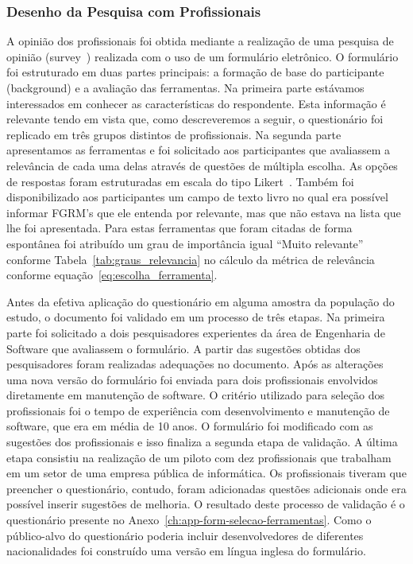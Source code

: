 \subsubsection{Desenho da Pesquisa com Profissionais}
\label{ssub:metodologia_desenho_da_pesquisa_com_profissionais}

A opinião dos profissionais foi obtida mediante a realização de uma pesquisa de
opinião (survey~\cite{wohlin2012experimentation}) realizada com o uso de um
formulário eletrônico. O formulário foi estruturado em duas partes principais: a
formação de base do participante (background) e a avaliação das ferramentas. Na
primeira parte estávamos interessados em conhecer as características do
respondente. Esta informação é relevante tendo em vista que, como descreveremos
a seguir, o questionário foi replicado em três grupos distintos de
profissionais. Na segunda parte apresentamos as ferramentas e foi solicitado aos
participantes que avaliassem a relevância de cada uma delas através de questões
de múltipla escolha. As opções de respostas foram estruturadas em escala do tipo
Likert~\cite{robbins2011plotting}. Também foi disponibilizado aos participantes
um campo de texto livro no qual era possível informar FGRM's que ele entenda por
relevante, mas que não estava na lista que lhe foi apresentada. Para estas
ferramentas que foram citadas de forma espontânea foi atribuído um grau de
importância igual ``Muito relevante'' conforme Tabela~\ref{tab:graus_relevancia}
no cálculo da métrica de relevância conforme
equação~\ref{eq:escolha_ferramenta}.

Antes da efetiva aplicação do questionário em alguma amostra da população do
estudo, o documento foi validado em um processo de três etapas. Na primeira
parte foi solicitado a dois pesquisadores experientes da área de Engenharia de
Software que avaliassem o formulário. A partir das sugestões obtidas dos
pesquisadores foram realizadas adequações no documento. Após as alterações uma
nova versão do formulário foi enviada para dois profissionais envolvidos
diretamente em manutenção de software. O critério utilizado para seleção dos
profissionais foi o tempo de experiência com desenvolvimento e manutenção de
software, que era em média de 10 anos. O formulário foi modificado com as
sugestões dos profissionais e isso finaliza a segunda etapa de validação. A
última etapa consistiu na realização de um piloto com dez profissionais que
trabalham em um setor de uma empresa pública de informática. Os profissionais
tiveram que preencher o questionário, contudo, foram adicionadas questões
adicionais onde era possível inserir sugestões de melhoria. O resultado deste
processo de validação é o questionário presente no
Anexo~\ref{ch:app-form-selecao-ferramentas}. Como o público-alvo do questionário
poderia incluir desenvolvedores de diferentes nacionalidades foi construído uma
versão em língua inglesa do formulário.

